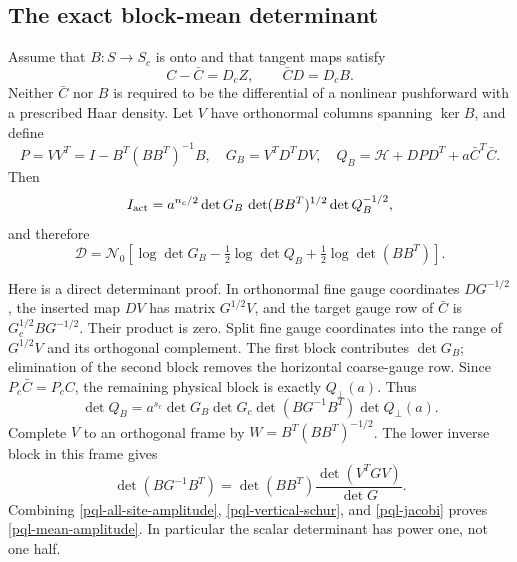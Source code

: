 \documentclass[11pt]{article}
\theoremstyle{remark}
\begin{document}
\subsection{The exact block-mean determinant}
\label{pql-mean-identity-section}

Assume that $B:S\to S_c$ is onto and that tangent maps satisfy
\begin{equation}
 C-\bar C=D_cZ,\qquad \bar CD=D_cB.
 \label{pql-tangent-identities}
\end{equation}
Neither $\bar C$ nor $B$ is required to be the differential of a
nonlinear pushforward with a prescribed Haar density.
Let $V$ have orthonormal columns spanning $\ker B$, and define
\begin{equation}
 P=VV^T=I-B^T(BB^T)^{-1}B,\quad
 G_B=V^TD^TDV,\quad
 Q_B=\mathcal H+DPD^T+a\bar C^T\bar C.
 \label{pql-mean-operators}
\end{equation}
Then
\begin{equation}
 I_{\rm act}
   =a^{n_c/2}\det G_B\,\det(BB^T)^{1/2}\det Q_B^{-1/2},
 \label{pql-mean-amplitude}
\end{equation}
and therefore
\begin{equation}
 \mathcal D=\mathcal N_0\left[
   \log\det G_B-\tfrac12\log\det Q_B
                          +\tfrac12\log\det(BB^T)\right].
 \label{pql-general-log}
\end{equation}

Here is a direct determinant proof. In orthonormal fine gauge
coordinates $DG^{-1/2}$, the inserted map $DV$ has matrix $G^{1/2}V$,
and the target gauge row of $\bar C$ is $G_c^{1/2}BG^{-1/2}$.
Their product is zero. Split fine gauge coordinates into the range
of $G^{1/2}V$ and its orthogonal complement. The first block contributes
$\det G_B$; elimination of the second block removes the horizontal
coarse-gauge row. Since $P_c\bar C=P_cC$, the remaining physical block
is exactly $Q_\perp(a)$. Thus
\begin{equation}
 \det Q_B=a^{s_c}\det G_B\det G_c
                    \det(BG^{-1}B^T)\det Q_\perp(a).
 \label{pql-vertical-schur}
\end{equation}
Complete $V$ to an orthogonal frame by
$W=B^T(BB^T)^{-1/2}$. The lower inverse block in this frame gives
\begin{equation}
 \det(BG^{-1}B^T)
       =\det(BB^T)\frac{\det(V^TGV)}{\det G}.
 \label{pql-jacobi}
\end{equation}
Combining \eqref{pql-all-site-amplitude},
\eqref{pql-vertical-schur}, and \eqref{pql-jacobi} proves
\eqref{pql-mean-amplitude}. In particular the scalar determinant
has power one, not one half.
\end{document}
